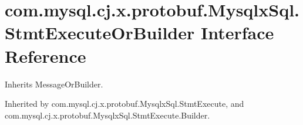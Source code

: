 \hypertarget{interfacecom_1_1mysql_1_1cj_1_1x_1_1protobuf_1_1_mysqlx_sql_1_1_stmt_execute_or_builder}{}\section{com.\+mysql.\+cj.\+x.\+protobuf.\+Mysqlx\+Sql.\+Stmt\+Execute\+Or\+Builder Interface Reference}
\label{interfacecom_1_1mysql_1_1cj_1_1x_1_1protobuf_1_1_mysqlx_sql_1_1_stmt_execute_or_builder}


Inherits Message\+Or\+Builder.



Inherited by com.\+mysql.\+cj.\+x.\+protobuf.\+Mysqlx\+Sql.\+Stmt\+Execute, and com.\+mysql.\+cj.\+x.\+protobuf.\+Mysqlx\+Sql.\+Stmt\+Execute.\+Builder.


